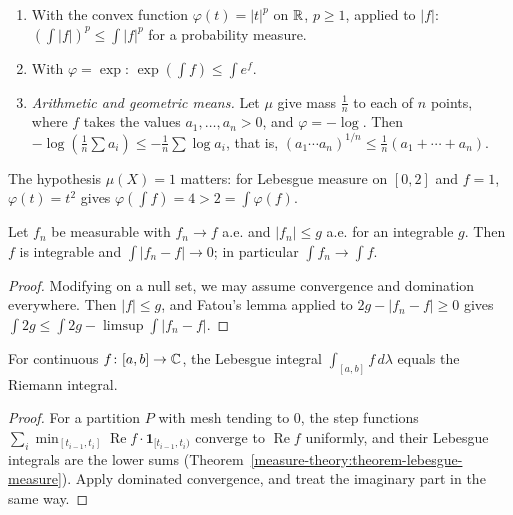 \begin{example}\label{measure-theory:example-jensen}
\begin{enumerate}
\item With the convex function $\varphi(t) = |t|^p$ on $\mathbb{R}$, $p \geq 1$, applied to $|f|$: $(\int|f|)^p \leq \int|f|^p$ for a probability measure.
\item With $\varphi = \exp$: $\exp(\int f) \leq \int e^f$.
\item \emph{Arithmetic and geometric means.} Let $\mu$ give mass $\frac1n$ to each of $n$ points, where $f$ takes the values $a_1, \ldots, a_n > 0$, and $\varphi = -\log$. Then
$-\log(\frac1n\sum a_i) \leq -\frac1n\sum\log a_i$, that is, $(a_1\cdots a_n)^{1/n} \leq \frac1n(a_1 + \cdots + a_n)$.
\end{enumerate}
The hypothesis $\mu(X) = 1$ matters: for Lebesgue measure on $[0, 2]$ and $f = 1$, $\varphi(t) = t^2$ gives $\varphi(\int f) = 4 > 2 = \int\varphi(f)$.
\end{example}

\begin{theorem}\label{measure-theory:theorem-dominated-convergence}
Let $f_n$ be measurable with $f_n \to f$ a.e. and $|f_n| \leq g$ a.e. for an integrable $g$. Then $f$ is integrable and $\int|f_n - f| \to 0$; in particular $\int f_n \to \int f$.
\end{theorem}

\begin{proof}
Modifying on a null set, we may assume convergence and domination everywhere. Then $|f| \leq g$, and Fatou's lemma applied to $2g - |f_n - f| \geq 0$ gives
$\int 2g \leq \int 2g - \limsup\int|f_n - f|$.
\end{proof}

\begin{proposition}\label{measure-theory:proposition-riemann-lebesgue}
For continuous $f \colon [a, b] \to \mathbb{C}$, the Lebesgue integral $\int_{[a,b]}f\,d\lambda$ equals the Riemann integral.
\end{proposition}

\begin{proof}
For a partition $P$ with mesh tending to $0$, the step functions $\sum_i\min_{[t_{i-1}, t_i]}\operatorname{Re}f \cdot \mathbf{1}_{[t_{i-1}, t_i)}$ converge to $\operatorname{Re}f$ uniformly, and their Lebesgue integrals are
the lower sums (Theorem~\ref{measure-theory:theorem-lebesgue-measure}). Apply dominated convergence, and treat the imaginary part in the same way.
\end{proof}

